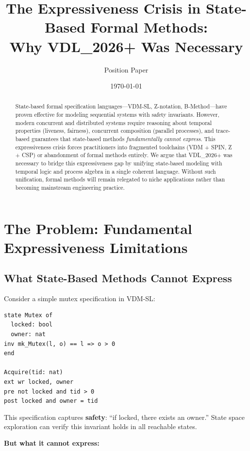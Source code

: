 \documentclass[11pt]{article}
\title{\textbf{The Expressiveness Crisis in State-Based Formal Methods:\\Why VDL\_2026+ Was Necessary}}
\author{Position Paper}
\date{\today}
\begin{document}
\maketitle

\begin{abstract}
State-based formal specification languages---VDM-SL, Z-notation, B-Method---have proven effective for modeling sequential systems with safety invariants. However, modern concurrent and distributed systems require reasoning about temporal properties (liveness, fairness), concurrent composition (parallel processes), and trace-based guarantees that state-based methods \textit{fundamentally cannot express}. This expressiveness crisis forces practitioners into fragmented toolchains (VDM + SPIN, Z + CSP) or abandonment of formal methods entirely. We argue that VDL\_2026+ was necessary to bridge this expressiveness gap by unifying state-based modeling with temporal logic and process algebra in a single coherent language. Without such unification, formal methods will remain relegated to niche applications rather than becoming mainstream engineering practice.
\end{abstract}

\section{The Problem: Fundamental Expressiveness Limitations}

\subsection{What State-Based Methods Cannot Express}

Consider a simple mutex specification in VDM-SL:

\begin{lstlisting}[caption={VDM-SL mutex (simplified)}]
state Mutex of
  locked: bool
  owner: nat
inv mk_Mutex(l, o) == l => o > 0
end

Acquire(tid: nat)
ext wr locked, owner
pre not locked and tid > 0
post locked and owner = tid
\end{lstlisting}

This specification captures \textbf{safety}: ``if locked, there exists an owner.'' State space exploration can verify this invariant holds in all reachable states.

\textbf{But what it cannot express:}
\end{document}
